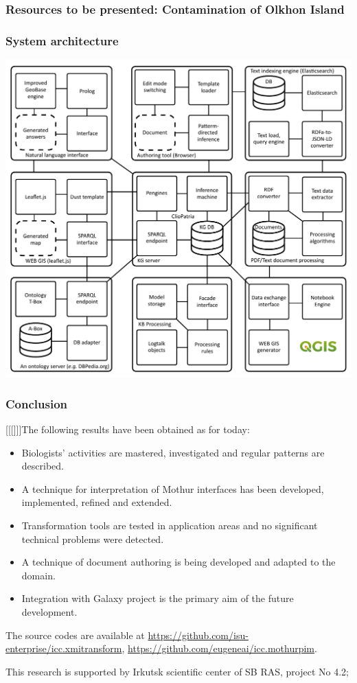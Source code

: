 \documentclass[10pt]{beamer}
\begin{document}
\begin{frame}
  \frametitle{Resources to be presented:  Contamination of  Olkhon Island}
\end{frame}

\begin{frame}
  \frametitle{System architecture}
  \centering
  \includegraphics[width=0.8\linewidth]{architecture.pdf}
\end{frame}

\begin{frame}
  \frametitle{Conclusion}
  [[[]]]The following results have been obtained as for today:
  \begin{itemize}
  \item Biologists' activities are mastered, investigated and regular patterns are described.
  \item A technique for interpretation of Mothur interfaces has been developed, implemented, refined and extended.
  \item Transformation tools are tested in application areas and no significant technical problems were detected.
  \item A technique of document authoring is being developed and adapted to the domain.
  \item Integration with Galaxy project is the primary aim of the future development.
  \end{itemize}
  The source codes are available at \url{https://github.com/isu-enterprise/icc.xmitransform}, \url{https://github.com/eugeneai/icc.mothurpim}.

  This research is supported by Irkutsk scientific center of SB RAS, project No 4.2;
\end{frame}
\end{document}
